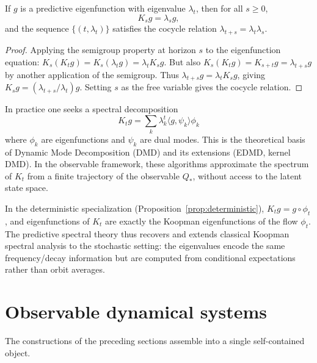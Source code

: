 \begin{proposition}\label{prop:eigen-propagation}
If $g$ is a predictive eigenfunction with eigenvalue $\lambda_t$, then
for all $s\ge0$,
\[
K_s g = \lambda_s g,
\]
and the sequence $\{(t,\lambda_t)\}$ satisfies the cocycle relation
$\lambda_{t+s}=\lambda_t\lambda_s$.
\end{proposition}

\begin{proof}
Applying the semigroup property at horizon $s$ to the eigenfunction equation:
$K_s(K_t g)=K_s(\lambda_t g)=\lambda_t K_s g$.  But also
$K_s(K_t g) = K_{s+t} g = \lambda_{t+s} g$ by another application of
the semigroup.  Thus $\lambda_{t+s} g = \lambda_t K_s g$, giving
$K_s g = (\lambda_{t+s}/\lambda_t) g$.  Setting $s$ as the free
variable gives the cocycle relation.
\end{proof}

\begin{remark}
In practice one seeks a spectral decomposition
\[
K_t g = \sum_k \lambda_k^t \langle g, \psi_k \rangle \phi_k
\]
where $\phi_k$ are eigenfunctions and $\psi_k$ are dual modes.
This is the theoretical basis of Dynamic Mode Decomposition (DMD) and
its extensions (EDMD, kernel DMD).  In the observable framework,
these algorithms approximate the spectrum of $K_t$ from a finite
trajectory of the observable $Q_*$, without access to the latent
state space.
\end{remark}

\begin{remark}
In the deterministic specialization (Proposition~\ref{prop:deterministic}),
$K_t g = g\circ\phi_t$, and eigenfunctions of $K_t$ are exactly the
Koopman eigenfunctions of the flow $\phi_t$.  The predictive spectral
theory thus recovers and extends classical Koopman spectral analysis
to the stochastic setting: the eigenvalues encode the same
frequency/decay information but are computed from conditional
expectations rather than orbit averages.
\end{remark}

\section{Observable dynamical systems}\label{sec:obs-dyn-sys}

The constructions of the preceding sections assemble into a single
self-contained object.

